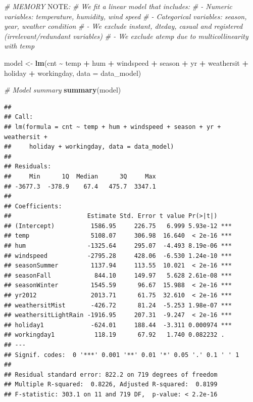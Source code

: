 \documentclass[
]{article}
\newenvironment{Shaded}{\begin{snugshade}}{\end{snugshade}}
\newcommand{\AlertTok}[1]{\textcolor[rgb]{0.94,0.16,0.16}{#1}}
\newcommand{\AttributeTok}[1]{\textcolor[rgb]{0.13,0.29,0.53}{#1}}
\newcommand{\CommentTok}[1]{\textcolor[rgb]{0.56,0.35,0.01}{\textit{#1}}}
\newcommand{\FunctionTok}[1]{\textcolor[rgb]{0.13,0.29,0.53}{\textbf{#1}}}
\newcommand{\NormalTok}[1]{#1}
\newcommand{\OtherTok}[1]{\textcolor[rgb]{0.56,0.35,0.01}{#1}}
\newcommand{\SpecialCharTok}[1]{\textcolor[rgb]{0.81,0.36,0.00}{\textbf{#1}}}
\begin{document}
\begin{Shaded}
\begin{Highlighting}[]
\CommentTok{\# MEMORY }\AlertTok{NOTE}\CommentTok{:}
\CommentTok{\# We fit a linear model that includes:}
\CommentTok{\# {-} Numeric variables: temperature, humidity, wind speed}
\CommentTok{\# {-} Categorical variables: season, year, weather condition}
\CommentTok{\# {-} We exclude \textquotesingle{}instant\textquotesingle{}, \textquotesingle{}dteday\textquotesingle{}, \textquotesingle{}casual\textquotesingle{} and \textquotesingle{}registered\textquotesingle{} (irrelevant/redundant variables)}
\CommentTok{\# {-} We exclude \textquotesingle{}atemp\textquotesingle{} due to multicollinearity with \textquotesingle{}temp\textquotesingle{}}

\NormalTok{model }\OtherTok{\textless{}{-}} \FunctionTok{lm}\NormalTok{(cnt }\SpecialCharTok{\textasciitilde{}}\NormalTok{ temp }\SpecialCharTok{+}\NormalTok{ hum }\SpecialCharTok{+}\NormalTok{ windspeed }\SpecialCharTok{+}\NormalTok{ season }\SpecialCharTok{+}\NormalTok{ yr }\SpecialCharTok{+}\NormalTok{ weathersit }\SpecialCharTok{+} 
\NormalTok{              holiday }\SpecialCharTok{+}\NormalTok{ workingday, }
            \AttributeTok{data =}\NormalTok{ data\_model)}

\CommentTok{\# Model summary}
\FunctionTok{summary}\NormalTok{(model)}
\end{Highlighting}
\end{Shaded}

\begin{verbatim}
## 
## Call:
## lm(formula = cnt ~ temp + hum + windspeed + season + yr + weathersit + 
##     holiday + workingday, data = data_model)
## 
## Residuals:
##     Min      1Q  Median      3Q     Max 
## -3677.3  -378.9    67.4   475.7  3347.1 
## 
## Coefficients:
##                     Estimate Std. Error t value Pr(>|t|)    
## (Intercept)          1586.95     226.75   6.999 5.93e-12 ***
## temp                 5108.07     306.98  16.640  < 2e-16 ***
## hum                 -1325.64     295.07  -4.493 8.19e-06 ***
## windspeed           -2795.28     428.06  -6.530 1.24e-10 ***
## seasonSummer         1137.94     113.55  10.021  < 2e-16 ***
## seasonFall            844.10     149.97   5.628 2.61e-08 ***
## seasonWinter         1545.59      96.67  15.988  < 2e-16 ***
## yr2012               2013.71      61.75  32.610  < 2e-16 ***
## weathersitMist       -426.72      81.24  -5.253 1.98e-07 ***
## weathersitLightRain -1916.95     207.31  -9.247  < 2e-16 ***
## holiday1             -624.01     188.44  -3.311 0.000974 ***
## workingday1           118.19      67.92   1.740 0.082232 .  
## ---
## Signif. codes:  0 '***' 0.001 '**' 0.01 '*' 0.05 '.' 0.1 ' ' 1
## 
## Residual standard error: 822.2 on 719 degrees of freedom
## Multiple R-squared:  0.8226, Adjusted R-squared:  0.8199 
## F-statistic: 303.1 on 11 and 719 DF,  p-value: < 2.2e-16
\end{verbatim}
\end{document}
